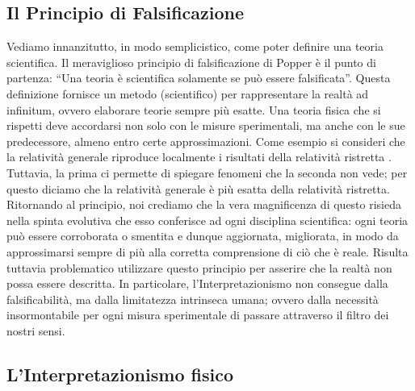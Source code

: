 \documentclass[]{article}
\begin{document}
	\subsection{Il Principio di Falsificazione}
	Vediamo innanzitutto, in modo semplicistico, come poter definire una teoria scientifica.
	Il meraviglioso principio di falsificazione di Popper è il punto di partenza: \enquote{Una teoria è scientifica solamente se può essere falsificata}. Questa definizione fornisce un metodo (scientifico) per rappresentare la realtà ad infinitum, ovvero elaborare teorie sempre più esatte. Una teoria fisica che si rispetti deve accordarsi non solo con le misure sperimentali, ma anche con le sue predecessore, almeno entro certe approssimazioni. Come esempio si consideri che la relatività generale riproduce localmente i risultati della relatività ristretta%
	. Tuttavia, la prima ci permette di spiegare fenomeni che la seconda non vede; per questo diciamo che la relatività generale è più esatta della relatività ristretta. \\
	Ritornando al principio, noi crediamo che la vera magnificenza di questo risieda nella spinta evolutiva che esso conferisce ad ogni disciplina scientifica: ogni teoria può essere corroborata o smentita e dunque aggiornata, migliorata, in modo da approssimarsi sempre di più alla corretta comprensione di ciò che è reale. 
	Risulta tuttavia problematico utilizzare questo principio per asserire che la realtà non possa essere descritta. In particolare, l'Interpretazionismo non consegue dalla falsificabilità, ma dalla limitatezza intrinseca umana; ovvero dalla necessità insormontabile per ogni misura sperimentale di passare attraverso il filtro dei nostri sensi.  
	
	\subsection{L'Interpretazionismo fisico}
	
\end{document}
